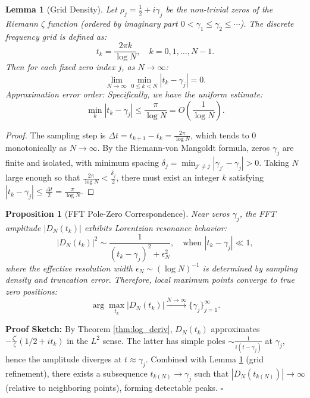 \documentclass[12pt,a4paper]{amsart}
\theoremstyle{plain}
\newtheorem{lemma}[theorem]{Lemma}
\newtheorem{proposition}[theorem]{Proposition}
\theoremstyle{definition}
\theoremstyle{remark}
\begin{document}
\begin{lemma}[Grid Density]\label{lem:density}
Let $\rho_j = \frac{1}{2} + i\gamma_j$ be the non-trivial zeros of the Riemann $\zeta$ function (ordered by imaginary part $0 < \gamma_1 \leq \gamma_2 \leq \cdots$). The discrete frequency grid is defined as:
\begin{equation}
t_k = \frac{2\pi k}{\log N}, \quad k = 0, 1, \dots, N-1.
\end{equation}
Then for each fixed zero index $j$, as $N \to \infty$:
\begin{equation}
\lim_{N\to\infty} \min_{0 \leq k < N} |t_k - \gamma_j| = 0.
\end{equation}
Approximation error order: Specifically, we have the uniform estimate:
\begin{equation}
\min_k |t_k - \gamma_j| \leq \frac{\pi}{\log N} = O\left(\frac{1}{\log N}\right).
\end{equation}
\end{lemma}

\begin{proof}
The sampling step is $\Delta t = t_{k+1} - t_k = \frac{2\pi}{\log N}$, which tends to 0 monotonically as $N\to\infty$. By the Riemann-von Mangoldt formula, zeros $\gamma_j$ are finite and isolated, with minimum spacing $\delta_j = \min_{j'\neq j}|\gamma_{j'}-\gamma_j| > 0$. Taking $N$ large enough so that $\frac{2\pi}{\log N} < \frac{\delta_j}{2}$, there must exist an integer $k$ satisfying $|t_k - \gamma_j| \leq \frac{\Delta t}{2} = \frac{\pi}{\log N}$.
\end{proof}

\begin{proposition}[FFT Pole-Zero Correspondence]\label{prop:pole_zero}
Near zeros $\gamma_j$, the FFT amplitude $|D_N(t_k)|$ exhibits Lorentzian resonance behavior:
\begin{equation}
|D_N(t_k)|^2 \sim \frac{1}{(t_k - \gamma_j)^2 + \epsilon_N^2}, \quad \text{when } |t_k - \gamma_j| \ll 1,
\end{equation}
where the effective resolution width $\epsilon_N \sim (\log N)^{-1}$ is determined by sampling density and truncation error. Therefore, local maximum points converge to true zero positions:
\begin{equation}
\arg\max_{t_k} |D_N(t_k)| \xrightarrow{N\to\infty} \{\gamma_j\}_{j=1}^\infty.
\end{equation}
\end{proposition}

\textbf{Proof Sketch:} By Theorem \ref{thm:log_deriv}, $D_N(t_k)$ approximates $-\frac{\zeta'}{\zeta}(1/2+it_k)$ in the $L^2$ sense. The latter has simple poles $\sim \frac{1}{i(t-\gamma_j)}$ at $\gamma_j$, hence the amplitude diverges at $t\approx\gamma_j$. Combined with Lemma \ref{lem:density} (grid refinement), there exists a subsequence $t_{k(N)}\to\gamma_j$ such that $|D_N(t_{k(N)})|\to\infty$ (relative to neighboring points), forming detectable peaks. $\square$
\end{document}
